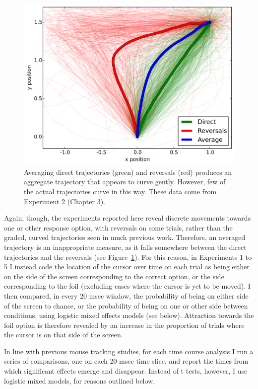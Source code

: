 \begin{figure}[ht]
  \centering
  \includegraphics[width=\figurewidth]{imgs/exp2-average-cursor}
  \caption[The pitfalls of averaging cursor trajectories.]{
    \label{fig:average-cursor}
    Averaging direct trajectories (green) and reversals (red)
    produces an aggregate trajectory that appears to curve gently.
    However, few of the actual trajectories curve in this way.
    These data come from Experiment 2 (Chapter 3).
  }
\end{figure}


Again, though, the experiments reported here
reveal discrete movements towards one or other response option,
with reversals on some trials,
rather than the graded, curved trajectories seen in much previous work.
Therefore, an averaged trajectory is an inappropriate measure,
as it falls somewhere between the direct trajectories and the reversals
(see Figure~\ref{fig:average-cursor}).
For this reason, in Experiments 1 to 5
I instead code the location of the cursor over time on each trial
as being either on
the side of the screen corresponding to the correct option,
or the side corresponding to the foil
(excluding cases where the cursor is yet to be moved).
I then compared, in every 20 msec window,
the probability of being on either side of the screen to chance,
or the probability of being on one or other side between conditions,
using logistic mixed effects models (see below).
Attraction towards the foil option is therefore revealed by
an increase in the proportion of trials
where the cursor is on that side of the screen.

In line with previous mouse tracking studies,
for each time course analysis I run a series of comparisons,
one on each 20 msec time slice,
and report the times from which significant effects emerge and disappear.
Instead of t tests, however, I use logistic mixed models,
for reasons outlined below.

